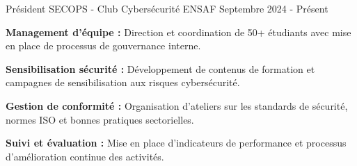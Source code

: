 
\begin{cventries}

    \cventry
    {Président} %
    {SECOPS - Club Cybersécurité} %
    {ENSAF} %
    {Septembre 2024 - Présent} %
    {
        \begin{cvitems} %
            \item {\textbf{Management d'équipe :} Direction et coordination de 50+ étudiants avec mise en place de processus de gouvernance interne.}
            \item {\textbf{Sensibilisation sécurité :} Développement de contenus de formation et campagnes de sensibilisation aux risques cybersécurité.}
            \item {\textbf{Gestion de conformité :} Organisation d'ateliers sur les standards de sécurité, normes ISO et bonnes pratiques sectorielles.}
            \item {\textbf{Suivi et évaluation :} Mise en place d'indicateurs de performance et processus d'amélioration continue des activités.}
        \end{cvitems}
    }

\end{cventries}